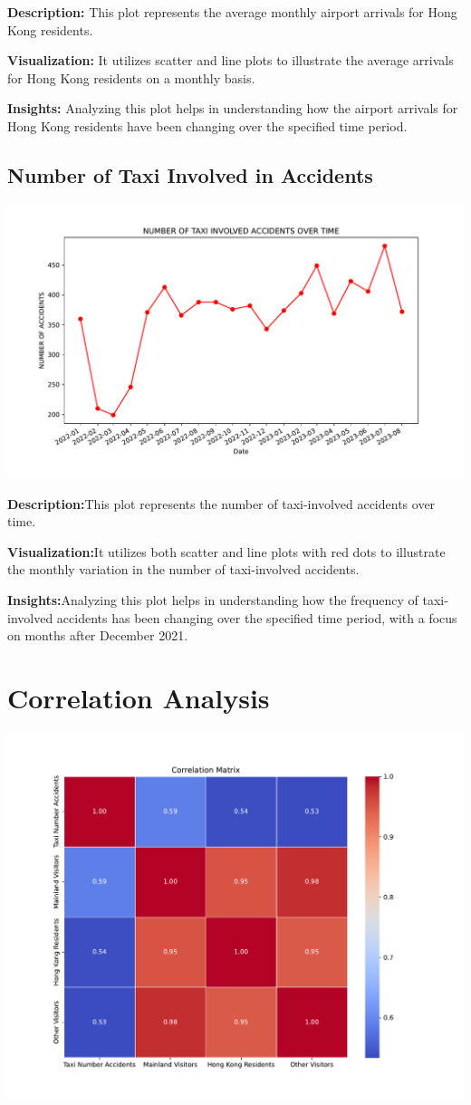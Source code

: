 \documentclass{article}
\begin{document}
\textbf{Description:} This plot represents the average monthly airport arrivals for Hong Kong residents.

\textbf{Visualization:} It utilizes scatter and line plots to illustrate the average arrivals for Hong Kong residents on a monthly basis.

\textbf{Insights:} Analyzing this plot helps in understanding how the airport arrivals for Hong Kong residents have been changing over the specified time period.


\subsection{Number of Taxi Involved in Accidents}
\includegraphics[width=\textwidth]{taxi_involvement.pdf}

\textbf{Description:}This plot represents the number of taxi-involved accidents over time.

\textbf{Visualization:}It utilizes both scatter and line plots with red dots to illustrate the monthly variation in the number of taxi-involved accidents.

\textbf{Insights:}Analyzing this plot helps in understanding how the frequency of taxi-involved accidents has been changing over the specified time period, with a focus on months after December 2021.


\section{Correlation Analysis}
\includegraphics[width=\textwidth]{heatmap.pdf}
\end{document}
